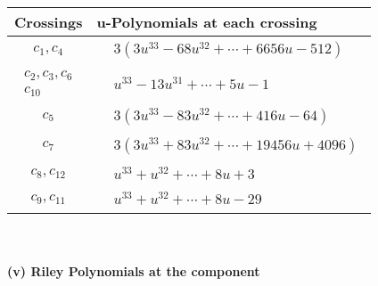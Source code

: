 \documentclass[1p]{elsarticle_modified}
\theoremstyle{definition}
\begin{document}
\begin{tabular}{m{50pt}|m{274pt}}
Crossings & \hspace{64pt}u-Polynomials at each crossing \\
\hline $$\begin{aligned}c_{1},c_{4}\end{aligned}$$&$\begin{aligned}
&3(3 u^{33}-68 u^{32}+\cdots+6656 u-512)
\end{aligned}$\\
\hline $$\begin{aligned}c_{2},c_{3},c_{6}\\c_{10}\end{aligned}$$&$\begin{aligned}
&u^{33}-13 u^{31}+\cdots+5 u-1
\end{aligned}$\\
\hline $$\begin{aligned}c_{5}\end{aligned}$$&$\begin{aligned}
&3(3 u^{33}-83 u^{32}+\cdots+416 u-64)
\end{aligned}$\\
\hline $$\begin{aligned}c_{7}\end{aligned}$$&$\begin{aligned}
&3(3 u^{33}+83 u^{32}+\cdots+19456 u+4096)
\end{aligned}$\\
\hline $$\begin{aligned}c_{8},c_{12}\end{aligned}$$&$\begin{aligned}
&u^{33}+u^{32}+\cdots+8 u+3
\end{aligned}$\\
\hline $$\begin{aligned}c_{9},c_{11}\end{aligned}$$&$\begin{aligned}
&u^{33}+u^{32}+\cdots+8 u-29
\end{aligned}$\\
\hline
\end{tabular}\\~\\
\newpage\renewcommand{\arraystretch}{1}
\flushleft \textbf{(v) Riley Polynomials at the component}\newline \\
\end{document}
